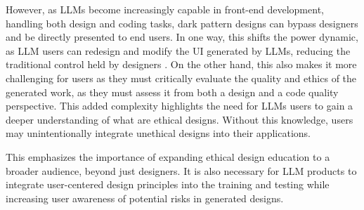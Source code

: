 However, as LLMs become increasingly capable in front-end development, handling both design and coding tasks, dark pattern designs can bypass designers and be directly presented to end users. In one way, this shifts the power dynamic, as LLM users can redesign and modify the UI generated by LLMs, reducing the traditional control held by designers \cite{a:56}. On the other hand, this also makes it more challenging for users as they must critically evaluate the quality and ethics of the generated work, as they must assess it from both a design and a code quality perspective. This added complexity highlights the need for LLMs users to gain a deeper understanding of what are ethical designs. Without this knowledge, users may unintentionally integrate unethical designs into their applications. 

This emphasizes the importance of expanding ethical design education to a broader audience, beyond just designers. It is also necessary for LLM products to integrate user-centered design principles into the training and testing while increasing user awareness of potential risks in generated designs.